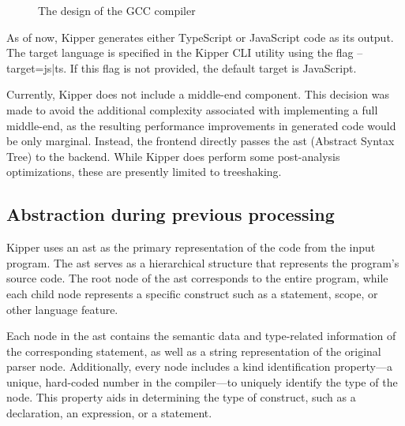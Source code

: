 \begin{figure}[h!]
	\centering
	\def\stackalignment{r}
	\caption{The design of the GCC compiler}
	\label{fig:implementation:gcccompiler}
\end{figure}

As of now, Kipper generates either TypeScript or JavaScript code as its output. The target language is specified in the Kipper CLI utility using the flag --target={js|ts}. If this flag is not provided, the default target is JavaScript.

Currently, Kipper does not include a middle-end component. This decision was made to avoid the additional complexity associated with implementing a full middle-end, as the resulting performance improvements in generated code would be only marginal. Instead, the frontend directly passes the \acrshort{ast} (Abstract Syntax Tree) to the backend. While Kipper does perform some post-analysis optimizations, these are presently limited to treeshaking.

\subsection{Abstraction during previous processing}

Kipper uses an \acrshort{ast} as the primary representation of the code from the input program. The \acrshort{ast} serves as a hierarchical structure that represents the program's source code. The root node of the \acrshort{ast} corresponds to the entire program, while each child node represents a specific construct such as a statement, scope, or other language feature.

Each node in the \acrshort{ast} contains the semantic data and type-related information of the corresponding statement, as well as a string representation of the original parser node. Additionally, every node includes a kind identification property—a unique, hard-coded number in the compiler—to uniquely identify the type of the node. This property aids in determining the type of construct, such as a declaration, an expression, or a statement.

